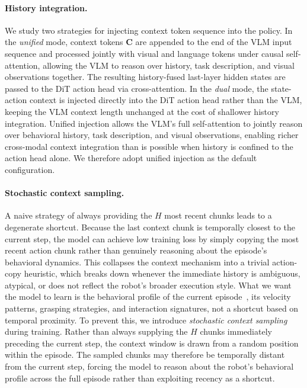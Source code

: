 \paragraph{History integration.}
We study two strategies for injecting context token sequence into the policy. In the \emph{unified} mode, context tokens $\mathbf{C}$ are appended to the end of the VLM input sequence and processed jointly with visual and language tokens under causal self-attention, allowing the VLM to reason over history, task description, and visual observations together. The resulting history-fused last-layer hidden states are passed to the DiT action head via cross-attention. In the \emph{dual} mode, the state-action context is injected directly into the DiT action head rather than the VLM, keeping the VLM context length unchanged at the cost of shallower history integration. Unified injection allows the VLM's full self-attention to jointly reason over behavioral history, task description, and visual observations, enabling richer cross-modal context integration than is possible when history is confined to the action head alone. We therefore adopt unified injection as the default configuration.

\paragraph{Stochastic context sampling.}
A naive strategy of always providing the $H$ most recent chunks leads to a degenerate shortcut. Because the last context chunk is temporally closest to the current step, the model can achieve low training loss by simply copying the most recent action chunk rather than genuinely reasoning about the episode's behavioral dynamics. This collapses the context mechanism into a trivial action-copy heuristic, which breaks down whenever the immediate history is ambiguous, atypical, or does not reflect the robot's broader execution style. What we want the model to learn is the behavioral profile of the current episode~\citep{huang2025dadu}, its velocity patterns, grasping strategies, and interaction signatures, not a shortcut based on temporal proximity. 
To prevent this, we introduce \textit{stochastic context sampling} during training. Rather than always supplying the $H$ chunks immediately preceding the current step, the context window is drawn from a random position within the episode. The sampled chunks may therefore be temporally distant from the current step, forcing the model to reason about the robot's behavioral profile across the full episode rather than exploiting recency as a shortcut. 

